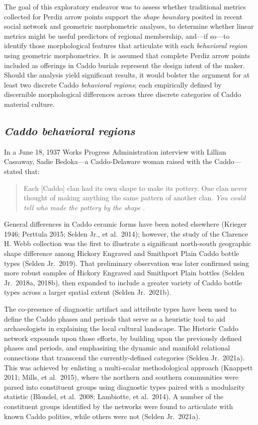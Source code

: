 \documentclass[smallextended]{svjour3}       %
\begin{document}
The goal of this exploratory endeavor was to assess whether traditional
metrics collected for Perdiz arrow points support the \emph{shape
boundary} posited in recent social network and geometric morphometric
analyses, to determine whether linear metrics might be useful predictors
of regional membership, and---if so---to identify those morphological
features that articulate with each \emph{behavioral region} using
geometric morphometrics. It is assumed that complete Perdiz arrow points
included as offerings in Caddo burials represent the design intent of
the maker. Should the analysis yield significant results, it would
bolster the argument for at least two discrete Caddo \emph{behavioral
regions}; each empirically defined by discernible morphological
differences across three discrete categories of Caddo material culture.

\hypertarget{caddo-behavioral-regions}{%
\subsection{\texorpdfstring{\emph{Caddo behavioral
regions}}{Caddo behavioral regions}}\label{caddo-behavioral-regions}}

In a June 18, 1937 Works Progress Administration interview with Lillian
Cassaway, Sadie Bedoka---a Caddo-Delaware woman raised with the
Caddo---stated that:

\begin{quote}
Each {[}Caddo{]} clan had its own shape to make its pottery. One clan
never thought of making anything the same pattern of another clan.
\emph{You could tell who made the pottery by the shape}
\cite[395]{RN9357x}.
\end{quote}

General differences in Caddo ceramic forms have been noted elsewhere
(Krieger 1946; Perttula 2015; Selden Jr., et al.~2014); however, the
study of the Clarence H. Webb collection was the first to illustrate a
significant north-south geographic shape difference among Hickory
Engraved and Smithport Plain Caddo bottle types (Selden Jr.~2019). That
preliminary observation was later confirmed using more robust samples of
Hickory Engraved and Smithport Plain bottles (Selden Jr.~2018a, 2018b),
then expanded to include a greater variety of Caddo bottle types across
a larger spatial extent (Selden Jr.~2021b).

The co-presence of diagnostic artifact and attribute types have been
used to define the Caddo phases and periods that serve as a heuristic
tool to aid archaeologists in explaining the local cultural landscape.
The Historic Caddo network expounds upon those efforts, by building upon
the previously defined phases and periods, and emphasizing the dynamic
and manifold relational connections that transcend the currently-defined
categories (Selden Jr.~2021a). This was achieved by enlisting a
multi-scalar methodological approach (Knappett 2011; Mills, et
al.~2015), where the northern and southern communities were parsed into
constituent groups using diagnostic types paired with a modularity
statistic (Blondel, et al.~2008; Lambiotte, et al.~2014). A number of
the constituent groups identified by the networks were found to
articulate with known Caddo polities, while others were not (Selden
Jr.~2021a).
\end{document}
